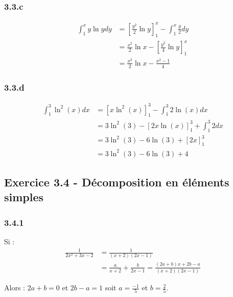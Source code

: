 \documentclass[a4paper,10pt]{report}
\begin{document}
\subsubsection*{3.3.c}
\begin{equation*}
	\begin{split}
		\int_1^x y \ln y dy &= \left[ \frac{y^2}{2} \ln y \right]_1^x - \int_1^x \frac{y}{2} dy \\
		                    &= \frac{x^2}{2} \ln x - \left[ \frac{y^2}{4} \ln y \right]_1^x \\
		                    &= \frac{x^2}{2} \ln x - \frac{x^2 -1}{4}
	\end{split}
\end{equation*}

\subsubsection*{3.3.d}
\begin{equation*}
	\begin{split}
		\int_1^3 \ln^2(x) dx &= \left[ x \ln^2(x) \right]_1^3 - \int_1^3 2\ln(x) dx \\
		                     &= 3 \ln^2(3) - \left[ 2x \ln(x) \right]_1^3 +  \int_1^3 2 dx \\
		                     &= 3 \ln^2(3) -6 \ln(3) + \left[ 2x \right]_1^3 \\
		                     &= 3 \ln^2(3) -6 \ln(3) + 4
	\end{split}
\end{equation*}

\subsection*{Exercice 3.4 - Décomposition en éléments simples}

\subsubsection*{3.4.1}
Si :
\begin{equation*}
	\begin{split}
		\frac{1}{2x^2 + 3x -2} &= \frac{1}{(x+2)(2x-1)} \\
		                       &= \frac{a}{x+2} +  \frac{b}{2x-1} = \frac{(2a+b)x + 2b -a}{(x+2)(2x-1)}
	\end{split}
\end{equation*}

Alors : $2a+b =0$ et $2b-a = 1$ soit $a=\frac{-1}{5}$ et $b = \frac{2}{5}$.
\end{document}
